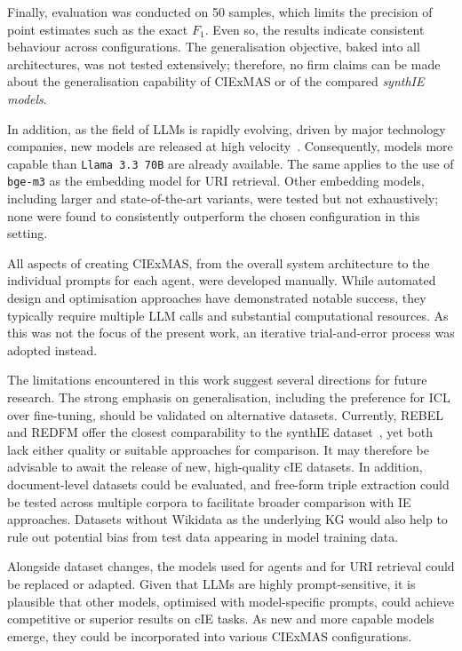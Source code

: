 \documentclass[a4paper,oneside,bibliography=totoc]{scrbook}
\begin{document}
Finally, evaluation was conducted on 50 samples, which limits the precision of point estimates such as the exact $F_{1}$. Even so, the results indicate consistent behaviour across configurations. The generalisation objective, baked into all architectures, was not tested extensively; therefore, no firm claims can be made about the generalisation capability of CIExMAS or of the compared \textit{synthIE models}.

In addition, as the field of \acp{LLM} is rapidly evolving, driven by major technology companies, new models are released at high velocity~\cite{Brown2020,Grattafiori2024,MetaAI2025,Chiang2024}. Consequently, models more capable than \texttt{Llama 3.3 70B} are already available. The same applies to the use of \texttt{bge-m3} as the embedding model for \ac{URI} retrieval. Other embedding models, including larger and state-of-the-art variants, were tested but not exhaustively; none were found to consistently outperform the chosen configuration in this setting.

All aspects of creating CIExMAS, from the overall system architecture to the individual prompts for each agent, were developed manually. While automated design and optimisation approaches have demonstrated notable success, they typically require multiple \ac{LLM} calls and substantial computational resources. As this was not the focus of the present work, an iterative trial-and-error process was adopted instead.

The limitations encountered in this work suggest several directions for future research. The strong emphasis on generalisation, including the preference for \ac{ICL} over fine-tuning, should be validated on alternative datasets. Currently, REBEL and REDFM offer the closest comparability to the synthIE dataset~\cite{HuguetCabot2021,Cabot2023}, yet both lack either quality or suitable approaches for comparison. It may therefore be advisable to await the release of new, high-quality \ac{cIE} datasets. In addition, document-level datasets could be evaluated, and free-form triple extraction could be tested across multiple corpora to facilitate broader comparison with \ac{IE} approaches. Datasets without Wikidata as the underlying \ac{KG} would also help to rule out potential bias from test data appearing in model training data.

Alongside dataset changes, the models used for agents and for \ac{URI} retrieval could be replaced or adapted. Given that \acp{LLM} are highly prompt-sensitive, it is plausible that other models, optimised with model-specific prompts, could achieve competitive or superior results on \ac{cIE} tasks. As new and more capable models emerge, they could be incorporated into various CIExMAS configurations.
\end{document}
